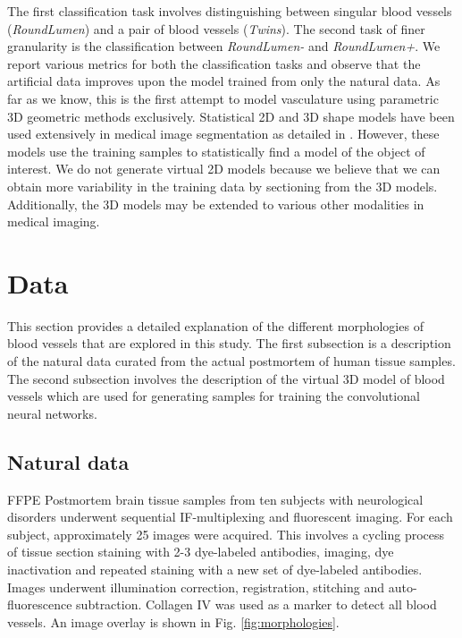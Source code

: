 The first classification task involves distinguishing between singular blood vessels (\textit{RoundLumen}) and a pair of blood vessels (\textit{Twins}). The second task of finer granularity is the classification between \textit{RoundLumen-} and \textit{RoundLumen+}. We report various metrics for both the classification tasks and observe that the artificial data improves upon the model trained from only the natural data.
As far as we know, this is the first attempt to model vasculature using parametric 3D geometric methods exclusively. Statistical 2D and 3D shape models have been used extensively in medical image segmentation as detailed in \cite{heimann2009statistical}. However, these models use the training samples to statistically find a model of the object of interest. We do not generate virtual 2D models because we believe that we can obtain more variability in the training data by sectioning from the 3D models. Additionally, the 3D models may be extended to various other modalities in medical imaging. 

\section{Data}

This section provides a detailed explanation of the different morphologies of blood vessels that are explored in this study. The first subsection is a description of the natural data curated from the actual postmortem of human tissue samples. The second subsection involves the description of the virtual 3D model of blood vessels which are used for generating samples for training the convolutional neural networks.

\subsection{Natural data}
FFPE Postmortem brain tissue samples from ten subjects with neurological disorders underwent sequential IF-multiplexing and fluorescent imaging. For each subject, approximately 25 images were acquired.   This involves a cycling process of tissue section staining with 2-3 dye-labeled antibodies, imaging, dye inactivation and repeated staining with a new set of dye-labeled antibodies. Images underwent illumination correction, registration, stitching and auto-fluorescence subtraction. Collagen IV was used as a marker to detect all blood vessels. An image overlay is shown in Fig. \ref{fig:morphologies}.

